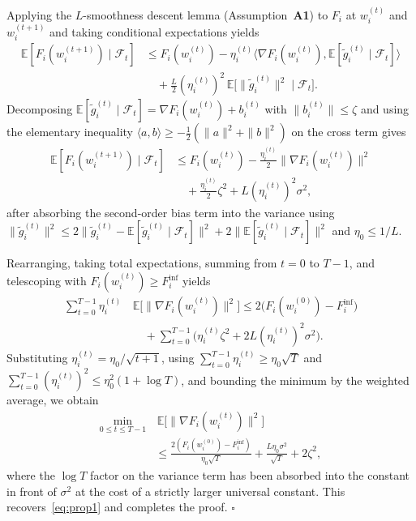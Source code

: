 Applying the $L$-smoothness descent lemma (Assumption~\textbf{A1}) to $F_i$ at $w_i^{(t)}$ and $w_i^{(t+1)}$ and taking conditional expectations yields
\begin{align*}
    \mathbb{E}[F_i(w_i^{(t+1)})\mid\mathcal{F}_t]
    &\le F_i(w_i^{(t)})-\eta_i^{(t)}\bigl\langle\nabla F_i(w_i^{(t)}),\mathbb{E}[\tilde g_i^{(t)}\mid\mathcal{F}_t]\bigr\rangle\\
    &\quad+\tfrac{L}{2}(\eta_i^{(t)})^2\,\mathbb{E}\!\bigl[\|\tilde g_i^{(t)}\|^2\mid\mathcal{F}_t\bigr].
\end{align*}
Decomposing $\mathbb{E}[\tilde g_i^{(t)}\mid\mathcal{F}_t]=\nabla F_i(w_i^{(t)})+b_i^{(t)}$ with $\|b_i^{(t)}\|\le\zeta$ and using the elementary inequality $\langle a,b\rangle\ge -\tfrac{1}{2}(\|a\|^2+\|b\|^2)$ on the cross term gives
\begin{align*}
    \mathbb{E}[F_i(w_i^{(t+1)})\mid\mathcal{F}_t]
    &\le F_i(w_i^{(t)})-\tfrac{\eta_i^{(t)}}{2}\bigl\|\nabla F_i(w_i^{(t)})\bigr\|^2\\
    &\quad+\tfrac{\eta_i^{(t)}}{2}\zeta^2+L(\eta_i^{(t)})^2\sigma^2,
\end{align*}
after absorbing the second-order bias term into the variance using $\|\tilde g_i^{(t)}\|^2\le 2\|\tilde g_i^{(t)}-\mathbb{E}[\tilde g_i^{(t)}\mid\mathcal{F}_t]\|^2+2\|\mathbb{E}[\tilde g_i^{(t)}\mid\mathcal{F}_t]\|^2$ and $\eta_0\le 1/L$.

Rearranging, taking total expectations, summing from $t=0$ to $T-1$, and telescoping with $F_i(w_i^{(t)})\ge F_i^{\inf}$ yields
\begin{equation*}
\begin{split}
    \sum_{t=0}^{T-1}\eta_i^{(t)}\,&\mathbb{E}\!\bigl[\|\nabla F_i(w_i^{(t)})\|^2\bigr]
    \le 2\bigl(F_i(w_i^{(0)})-F_i^{\inf}\bigr)\\
    &\quad+\sum_{t=0}^{T-1}\!\!\bigl(\eta_i^{(t)}\zeta^2+2L(\eta_i^{(t)})^2\sigma^2\bigr).
\end{split}
\end{equation*}
Substituting $\eta_i^{(t)}=\eta_0/\sqrt{t+1}$, using $\sum_{t=0}^{T-1}\eta_i^{(t)}\ge\eta_0\sqrt{T}$ and $\sum_{t=0}^{T-1}(\eta_i^{(t)})^2\le\eta_0^2(1+\log T)$, and bounding the minimum by the weighted average, we obtain
\begin{equation*}
\begin{split}
    \min_{0\le t\le T-1}&\,\mathbb{E}\!\bigl[\|\nabla F_i(w_i^{(t)})\|^2\bigr]\\
    &\le \frac{2(F_i(w_i^{(0)})-F_i^{\inf})}{\eta_0\sqrt{T}}+\frac{L\eta_0\sigma^2}{\sqrt{T}}+2\zeta^2,
\end{split}
\end{equation*}
where the $\log T$ factor on the variance term has been absorbed into the constant in front of $\sigma^2$ at the cost of a strictly larger universal constant. This recovers~\eqref{eq:prop1} and completes the proof. \hfill$\square$

